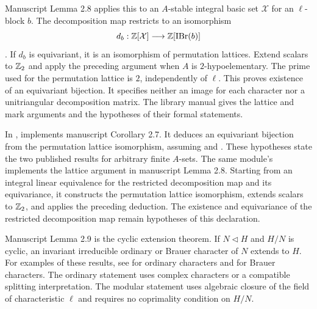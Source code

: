 Manuscript Lemma 2.8 applies this to an $A$-stable integral basic
set $\mathcal X$ for an $\ell$-block $b$. The decomposition map restricts to an isomorphism
\[
 d_b:\mathbb Z[\mathcal X]\longrightarrow\mathbb Z[\operatorname{IBr}(b)]
\]
\cite[(1.1)--(1.2)]{GeckHiss1991}.
If $d_b$ is equivariant, it is an isomorphism of permutation
lattices. Extend scalars to $\mathbb Z_2$ and apply the preceding
argument when $A$ is $2$-hypoelementary. The prime used for the
permutation lattice is $2$, independently of $\ell$. This proves
existence of an equivariant bijection. It specifies neither an
image for each character nor a unitriangular decomposition
matrix. The library manual gives the lattice and mark arguments
and the hypotheses of their formal statements.

\begin{implementation}
In ,
 implements manuscript Corollary 2.7.
It deduces an equivariant bijection from the permutation lattice
isomorphism, assuming  and
. These hypotheses state the two published results for arbitrary finite $A$-sets.
The same module's  implements the
lattice argument in manuscript Lemma 2.8. Starting from an integral
linear equivalence for the restricted decomposition map and its
equivariance, it constructs the permutation lattice isomorphism,
extends scalars to $\mathbb Z_2$, and applies the preceding deduction.
The existence and equivariance of the restricted decomposition map
remain hypotheses of this declaration.
\end{implementation}

Manuscript Lemma 2.9 is the cyclic extension theorem. If $N\lhd H$
and $H/N$ is cyclic, an invariant irreducible ordinary or Brauer
character of $N$ extends to $H$. For examples of these results, see \cite[Corollary~11.22]{Isaacs1976} for ordinary characters and \cite[Theorem~8.12]{Navarro1998} for Brauer characters.
The ordinary statement uses complex characters
or a compatible splitting interpretation. The modular statement
uses algebraic closure of the field of characteristic $\ell$
and requires no coprimality condition on $H/N$.

